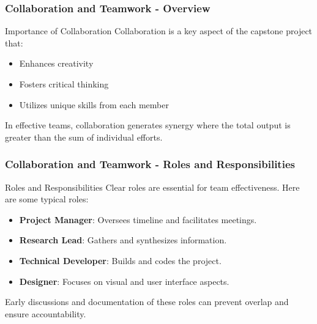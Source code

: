 \documentclass{beamer}
\begin{document}
\begin{frame}[fragile]
    \frametitle{Collaboration and Teamwork - Overview}
    \begin{block}{Importance of Collaboration}
        Collaboration is a key aspect of the capstone project that:
        \begin{itemize}
            \item Enhances creativity
            \item Fosters critical thinking
            \item Utilizes unique skills from each member
        \end{itemize}
        In effective teams, collaboration generates synergy where the total output is greater than the sum of individual efforts.
    \end{block}
\end{frame}

\begin{frame}[fragile]
    \frametitle{Collaboration and Teamwork - Roles and Responsibilities}
    \begin{block}{Roles and Responsibilities}
        Clear roles are essential for team effectiveness. Here are some typical roles:
        \begin{itemize}
            \item \textbf{Project Manager}: Oversees timeline and facilitates meetings.
            \item \textbf{Research Lead}: Gathers and synthesizes information.
            \item \textbf{Technical Developer}: Builds and codes the project.
            \item \textbf{Designer}: Focuses on visual and user interface aspects.
        \end{itemize}
        Early discussions and documentation of these roles can prevent overlap and ensure accountability.
    \end{block}
\end{frame}
\end{document}
